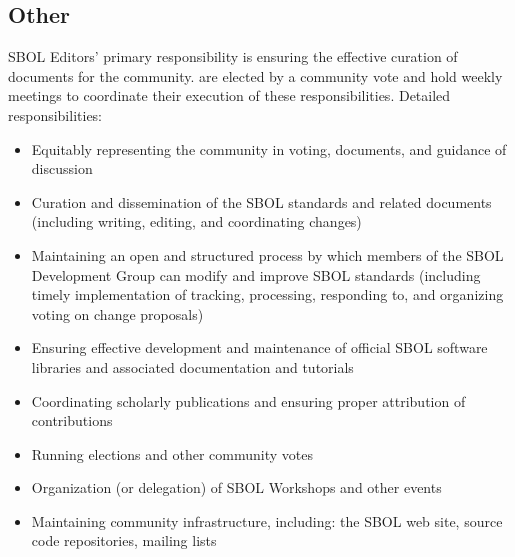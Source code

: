\documentclass[11pt,a4paper,sans]{moderncv}        %
\begin{document}

\subsection{Other}

{}{}
{SBOL Editors' primary responsibility is ensuring the effective curation of documents for the community.  are elected by a community vote and hold weekly meetings to coordinate their execution of these responsibilities.
	\newline{}
	Detailed responsibilities:
	\begin{itemize}
		\item Equitably representing the community in voting, documents, and guidance of discussion
		\item Curation and dissemination of the SBOL standards and related documents (including writing, editing, and coordinating changes)
		\item Maintaining an open and structured process by which members of the SBOL Development Group can modify and improve SBOL standards (including timely implementation of tracking, processing, responding to, and organizing voting on change proposals)
		\item Ensuring effective development and maintenance of official SBOL software libraries and associated documentation and tutorials
		\item Coordinating scholarly publications and ensuring proper attribution of contributions
		\item Running elections and other community votes
		\item Organization (or delegation) of SBOL Workshops and other events
		\item Maintaining community infrastructure, including: the SBOL web site, source code repositories, mailing lists
\end{itemize}}


%
%
\end{document}

